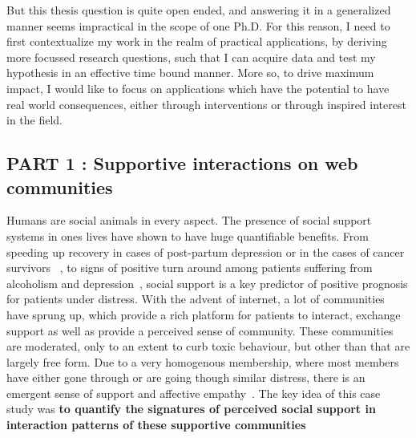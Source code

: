\vspace{0.5cm}
\noindent{}
\vspace{0.5cm} 

But this thesis question is quite open ended, and answering it in a generalized manner seems impractical in the scope of one Ph.D. For this reason, I need to first contextualize my work in the realm  of practical applications, by deriving more focussed research questions, such that I can acquire data and test my hypothesis in an effective time bound manner. More so, to drive maximum impact, I would like to focus on applications which have the potential to have real world consequences, either through interventions or through inspired interest in the field.

\subsection{PART 1 : Supportive interactions on web communities}
Humans are social animals in every aspect. The presence of social support systems in ones lives have shown to have huge quantifiable benefits. From speeding up recovery in cases of post-partum depression or in the cases of cancer survivors~\cite{collins1993social,dunkel1984social,baron1990social} , to signs of positive turn around among patients suffering from alcoholism and depression~\cite{peirce2000longitudinal,brown1986social}, social support is a key predictor of positive prognosis for patients under distress. With the advent of internet, a lot of communities have sprung up, which provide a rich platform for patients to interact, exchange support as well as provide a perceived sense of community. These communities are moderated, only to an extent to curb toxic behaviour, but other than that are largely free form. Due to a very homogenous membership, where most members have either gone through or are going though similar distress, there is an emergent sense of support and affective empathy~\cite{de2016stroke}. The key idea of this case study was \textbf{to quantify the signatures of perceived social support in interaction patterns of these supportive communities} 

